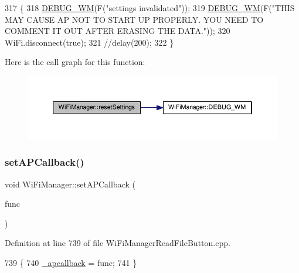 \begin{DoxyCode}
317                                 \{
318   \hyperlink{class_wi_fi_manager_ae5f595c670ccbcf9a191baf50f5c7c26}{DEBUG\_WM}(F(\textcolor{stringliteral}{"settings invalidated"}));
319   \hyperlink{class_wi_fi_manager_ae5f595c670ccbcf9a191baf50f5c7c26}{DEBUG\_WM}(F(\textcolor{stringliteral}{"THIS MAY CAUSE AP NOT TO START UP PROPERLY. YOU NEED TO COMMENT IT OUT AFTER ERASING
       THE DATA."}));
320   WiFi.disconnect(\textcolor{keyword}{true});
321   \textcolor{comment}{//delay(200);}
322 \}
\end{DoxyCode}
Here is the call graph for this function\+:\nopagebreak
\begin{figure}[H]
\begin{center}
\leavevmode
\includegraphics[width=350pt]{d4/dc8/class_wi_fi_manager_a0027749816b6c66bc845d7c5db760a33_cgraph}
\end{center}
\end{figure}
\mbox{\label{class_wi_fi_manager_a353ab556f96020ad7a08e9a91cea8bea}} 
\subsubsection{\texorpdfstring{set\+A\+P\+Callback()}{setAPCallback()}}
{\footnotesize\ttfamily void Wi\+Fi\+Manager\+::set\+A\+P\+Callback (\begin{DoxyParamCaption}\item[{void($\ast$)(\hyperlink{class_wi_fi_manager}{Wi\+Fi\+Manager} $\ast$)}]{func }\end{DoxyParamCaption})}



Definition at line 739 of file Wi\+Fi\+Manager\+Read\+File\+Button.\+cpp.


\begin{DoxyCode}
739                                                                           \{
740   \hyperlink{class_wi_fi_manager_ad166247d94aef10a3a8aa34da1351b27}{\_apcallback} = func;
741 \}
\end{DoxyCode}
\mbox{\label{class_wi_fi_manager_a70007205081cd9bfe4123b65553adf42}} 
